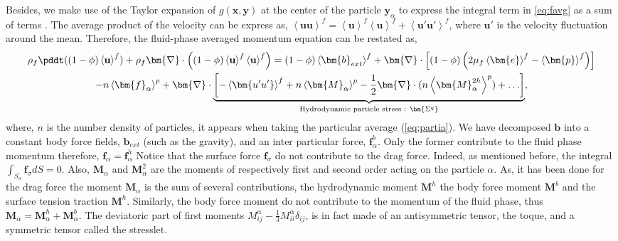 Besides, we make use of the Taylor expansion of $g(\textbf{x},\bm{y})$ at the center of the particle $\bm{y}_\alpha$ to express the integral term in \ref{eq:favg} as a sum of terms \citep{jackson1997locally}.  
The average product of the velocity can be express as, $\left<\bm{uu}\right>^f = \left<\textbf{u}\right>^f\left<\textbf{u}\right>^f + \left<\bm{u'u'}\right>^f$, where $\bm{u'}$ is the velocity fluctuation around the mean. 
Therefore, the fluid-phase averaged momentum equation can be restated as, 
\begin{multline}
    \rho_f\pddt ((1-\phi)\left<\textbf{u}\right>^f) 
    + \rho_f\bm{\nabla}\cdot\left((1-\phi) \left<\textbf{u}\right>^f\left<\textbf{u}\right>^f\right)
    = (1-\phi)\left<\bm{b}_{ext}\right>^f 
    +\bm{\nabla}\cdot\left[(1-\phi) \left(2\mu_f\left<\bm{e}\right>^f 
    -\left<\bm{p}\right>^f\right)\right]\\
    -n\left<\bm{f}_\alpha\right>^p
    +\bm{\nabla}\cdot
    \underbrace{
        \left[
            - \left<\bm{u'u'}\right>^f 
            +n\left<\bm{M}_\alpha\right>^p 
            -\frac{1}{2}\bm{\nabla}\cdot(n\left<\bm{M}^{2h}_\alpha\right>^p) 
            + \ldots
        \right]
    }_{\text{Hydrodynamic particle stress : } \bm{\Sigma^q}},
    \label{eq:favgsp}
\end{multline}
where, $n$ is the number density of particles, it appears when taking the particular average (\ref{eq:partia}). 
We have decomposed $\bm{b}$ into a constant body force fields, $\bm{b}_{ext}$ (such as the gravity), and an inter particular force, $\bm{f}^b_\alpha$. 
Only the former contribute to the fluid phase momentum therefore, $\bm{f}_\alpha =\bm{f}_\alpha^h$
Notice that the surface force $\bm{f}_\sigma$ do not contribute to the drag force. 
Indeed, as mentioned before, the integral $\int_{S_\alpha} \bm{f}_\sigma dS = 0$.  
Also, $\bm{M}_\alpha$ and $\bm{M}^{2}_\alpha$ are the moments of respectively first and second order acting on the particle $\alpha$.
As, it has been done for the drag force the moment $\bm{M}_\alpha$ is the sum of several contributions, the hydrodynamic moment $\bm{M}^h$ the body force moment $\bm{M}^b$ and the surface tension traction $\bm{M}^h$.
Similarly, the body force moment do not contribute to the momentum of the fluid phase, thus $\bm{M}_\alpha = \bm{M}^h_\alpha +\bm{M}_\alpha^b$. 
The deviatoric part of first moments $M_{ij}^\alpha - \frac{1}{3}M_{ii}^\alpha\delta_{ij}$, is in fact made of an antisymmetric tensor, the toque, and a symmetric tensor called the stresslet.
